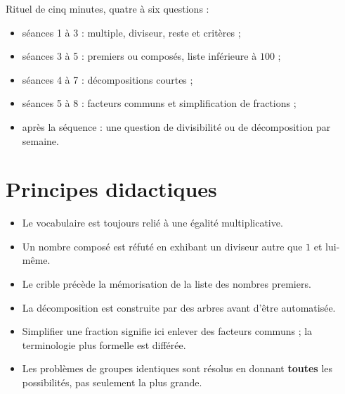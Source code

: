 \documentclass[12pt,a4paper]{article}
\begin{document}
Rituel de cinq minutes, quatre à six questions :

\begin{itemize}
  \item séances 1 à 3 : multiple, diviseur, reste et critères ;
  \item séances 3 à 5 : premiers ou composés, liste inférieure à \(100\) ;
  \item séances 4 à 7 : décompositions courtes ;
  \item séances 5 à 8 : facteurs communs et simplification de fractions ;
  \item après la séquence : une question de divisibilité ou de décomposition par semaine.
\end{itemize}

\section*{Principes didactiques}

\begin{itemize}
  \item Le vocabulaire est toujours relié à une égalité multiplicative.
  \item Un nombre composé est réfuté en exhibant un diviseur autre que \(1\)
        et lui-même.
  \item Le crible précède la mémorisation de la liste des nombres premiers.
  \item La décomposition est construite par des arbres avant d'être automatisée.
  \item Simplifier une fraction signifie ici enlever des facteurs communs ;
        la terminologie plus formelle est différée.
  \item Les problèmes de groupes identiques sont résolus en donnant
        \textbf{toutes} les possibilités, pas seulement la plus grande.
\end{itemize}
\end{document}

